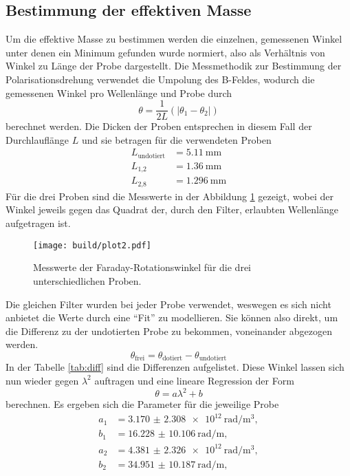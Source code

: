 \subsection{Bestimmung der effektiven Masse}
Um die effektive Masse zu bestimmen werden die einzelnen, gemessenen Winkel unter denen ein Minimum gefunden wurde
normiert, also als Verhältnis von Winkel zu Länge der Probe dargestellt. 
Die Messmethodik zur Bestimmung der Polarisationsdrehung verwendet die Umpolung des B-Feldes, wodurch die gemessenen Winkel pro Wellenlänge und Probe durch 
\begin{equation}
\theta = \frac{1}{2L} (|\theta_1 - \theta_2|)
\end{equation}
berechnet werden. Die Dicken der Proben entsprechen in diesem Fall der Durchlauflänge $L$ und sie betragen für die verwendeten Proben
\begin{align*}
L_{\text{undotiert}} &= \SI{5.11}{\milli\meter}\\
L_{1\text{,}2} &= \SI{1.36}{\milli\meter} \\
L_{2\text{,}8} &= \SI{1.296}{\milli\meter}
\end{align*}
Für die drei Proben sind die Messwerte in der Abbildung \ref{fig:maf2} gezeigt, wobei der Winkel 
jeweils gegen das Quadrat der, durch den Filter, erlaubten Wellenlänge aufgetragen ist.
\begin{figure}
    \centering
    \texttt{[image: build/plot2.pdf]}
    \caption{Messwerte der Faraday-Rotationswinkel für die drei unterschiedlichen Proben. }
    \label{fig:maf2}
\end{figure}
Die gleichen Filter wurden bei jeder Probe verwendet, weswegen es sich nicht anbietet die Werte durch eine \enquote{Fit} zu modellieren.
Sie können also direkt, um die Differenz zu der undotierten Probe zu bekommen, voneinander abgezogen werden.
\begin{equation}
\theta_{\text{frei}} = \theta_{\text{dotiert}} - \theta_{\text{undotiert}}
\end{equation}
In der Tabelle \ref{tab:diff} sind die Differenzen aufgelistet. Diese Winkel lassen sich nun wieder gegen $\lambda^2$ auftragen und eine lineare Regression
der Form
\begin{equation}
\theta = a \lambda^2 + b
\end{equation}
berechnen.
Es ergeben sich die Parameter für die jeweilige Probe
\begin{align*}
a_{1} &= \SI{3.170(2308)e12}{\radian\per\meter\tothe{3}},\\
b_{1} &= \SI{16.228(10106)}{\radian\per\meter}, \\
a_{2} &= \SI{4.381(2326)e12}{\radian\per\meter\tothe{3}},\\
b_{2} &= \SI{34.951(10187)}{\radian\per\meter}, \\
\end{align*}
